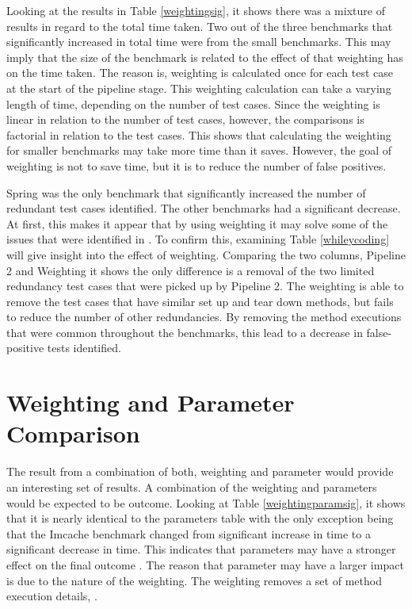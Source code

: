 Looking at the results in Table \ref{weightingsig}, it shows there was a mixture of results in regard to the total time taken. Two out of the three benchmarks that significantly increased in total time were from the small benchmarks. This may imply that the size of the benchmark is related to the effect of that weighting has on the time taken. The reason is, weighting is calculated once for each test case at the start of the pipeline stage. This weighting calculation can take a varying length of time, depending on the number of test cases. Since the weighting is linear in relation to the number of test cases, however, the comparisons is factorial in relation to the test cases. This shows that calculating the weighting for smaller benchmarks may take more time than it saves. However, the goal of weighting is not to save time, but it is to reduce the number of false positives.

Spring was the only benchmark that significantly increased the number of redundant test cases identified. The other benchmarks had a significant decrease. At first, this makes it appear that by using weighting it may solve some of the issues that were identified in \cite{koochakzadeh2009test} \cite{li2008static}. To confirm this, examining Table \ref{whileycoding} will give insight into the effect of weighting. Comparing the two columns, Pipeline 2 and Weighting it shows the only difference is a removal of the two limited redundancy test cases that were picked up by Pipeline 2. The weighting is able to remove the test cases that have similar set up and tear down methods, but fails to reduce the number of other redundancies. By removing the method executions that were common throughout the benchmarks, this lead to a decrease in false-positive tests identified.


\section{Weighting and Parameter Comparison}

The result from a combination of both, weighting and parameter would provide an interesting set of results. A combination of the weighting and parameters would be expected to be outcome. Looking at Table \ref{weightingparamsig}, it shows that it is nearly identical to the parameters table with the only exception being that the Imcache benchmark changed from significant increase in time to a significant decrease in time. This indicates that parameters may have a stronger effect on the final outcome . The reason that parameter may have a larger impact is due to the nature of the weighting. The weighting removes a set of method execution details, .

